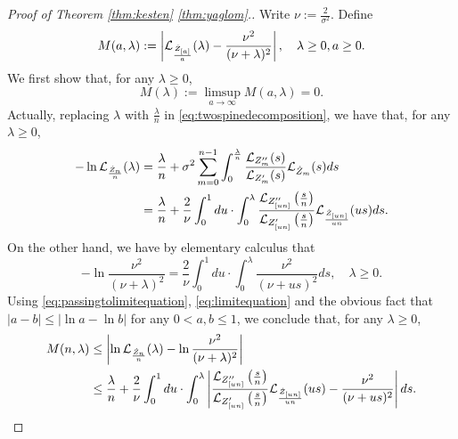 \documentclass[12pt]{amsart}
\numberwithin{equation}{section}
\newcommand{\abs}[1]{\left| #1 \right|}
\newcommand{\expr}[1]{\left( #1 \right)}
\begin{document}
\medskip
\begin{proof}[Proof of Theorem \ref{thm:kesten} \eqref{thm:yaglom}.]
	Write $\nu:=\frac{2}{\sigma^2}$. Define
\begin{equation*}
		M(a,\lambda)
	:=
		\abs{\cL_{\frac{\dot Z_{[a]}}{a}}(\lambda)-
		\frac{\nu^2}{(\nu+\lambda)^2}},
	\quad
		\lambda \geq 0, a\geq 0.
		\end{equation*}
	We first show that, for any $\lambda\geq 0$,
\begin{equation}
\label{eq:Miszerofunction}
		M(\lambda)
	:=
		\limsup_{a\to\infty}M(a,\lambda)
	=
		0.
\end{equation}
	Actually, replacing $\lambda$ with $\frac{\lambda}{n}$ in \eqref{eq:twospinedecomposition}, we have that, for any $\lambda\geq 0$,
\begin{equation}
\label{eq:passingtolimitequation}
\begin{split}
		-\ln \cL_{\frac{\dot Z_n}{n}}(\lambda)
	&=
		\frac{\lambda}{n}+\sigma^2\sum_{m=0}^{n-1}\int_0^{\frac{\lambda}{n}} \frac{\cL_{Z''_m}(s)}{\cL_{Z'_m}(s)}\cL_{\dot Z_{m}}(s)ds
	\\&=
		\frac{\lambda}{n}+\frac{2}{\nu}\int_0^1 du \cdot \int_0^{\lambda} \frac{\cL_{Z''_{[un]}}\expr{\frac{s}{n}}}{\cL_{Z'_{[un]}}\expr{\frac{s}{n}}}\cL_{\frac{\dot Z_{[un]}}{un}}(us)ds.
\end{split}
\end{equation}
	On the other hand, we have by elementary calculus that
\begin{equation}
\label{eq:limitequation}
        -\ln\frac{\nu^2}{(\nu+\lambda)^2}
    =
		\frac{2}{\nu}\int_0^1du\cdot\int_0^\lambda \frac{\nu^2}{(\nu+us)^2}ds,
\quad \lambda\geq 0.
\end{equation}
	Using \eqref{eq:passingtolimitequation}, \eqref{eq:limitequation} and the obvious fact that $\abs{a-b}\leq\abs{\ln a-\ln b}$ for any $0<a,b\leq 1$, we conclude that, for any $\lambda\geq 0$,
\begin{equation}
\label{eq:inequalitybeforepassingtolimit}
\begin{split}
        M(n,\lambda)
    &\leq
		\abs{\ln \cL_{\frac{\dot Z_n}{n}}(\lambda)-\ln\frac{\nu^2}{(\nu+\lambda)^2}}
	\\&\leq
		\frac{\lambda}{n}
	+
	    \frac{2}{\nu}\int_0^1 du
	\cdot
	    \int_0^{\lambda} \abs{\frac{\cL_{Z''_{[un]}}\expr{\frac{s}{n}}}{\cL_{Z'_{[un]}}\expr{\frac{s}{n}}}\cL_{\frac{\dot Z_{[un]}}{un}}(us)- \frac{\nu^2}{(\nu+us)^2}}ds.
\end{split}
\end{equation}

\end{proof}
\end{document}
